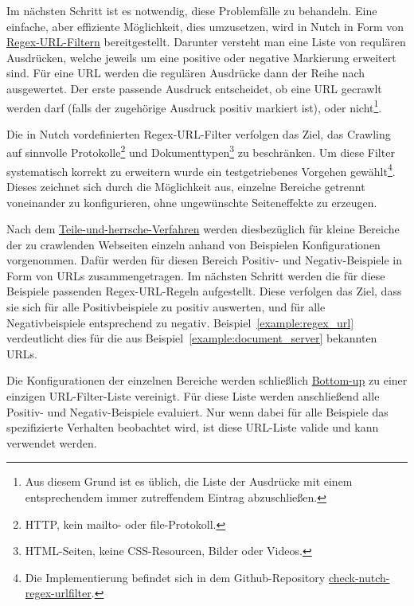 Im nächsten Schritt ist es notwendig, diese Problemfälle zu behandeln.
Eine einfache, aber effiziente Möglichkeit, dies umzusetzen, wird in Nutch in Form von \href{https://github.com/apache/nutch/blob/master/conf/regex-urlfilter.txt.template}{Regex-URL-Filtern} bereitgestellt.
Darunter versteht man eine Liste von requlären Ausdrücken, welche jeweils um eine positive oder negative Markierung erweitert sind.
Für eine URL werden die regulären Ausdrücke dann der Reihe nach ausgewertet.
Der erste passende Ausdruck entscheidet, ob eine URL gecrawlt werden darf (falls der zugehörige Ausdruck positiv markiert ist),
oder nicht\footnote{Aus diesem Grund ist es üblich, 
die Liste der Ausdrücke mit einem entsprechendem immer zutreffendem Eintrag abzuschließen.}.

Die in Nutch vordefinierten Regex-URL-Filter verfolgen das Ziel,
das Crawling auf sinnvolle Protokolle\footnote{HTTP, kein mailto- oder file-Protokoll.}
und Dokumenttypen\footnote{HTML-Seiten, keine CSS-Resourcen, Bilder oder Videos.} zu beschränken.
Um diese Filter systematisch korrekt zu erweitern wurde ein
testgetriebenes Vorgehen gewählt\footnote{Die Implementierung befindet
sich in dem Github-Repository \href{https://github.com/mam10eks/check-nutch-regex-urlfilter}{check-nutch-regex-urlfilter}.}.
Dieses zeichnet sich durch die Möglichkeit aus, einzelne Bereiche getrennt voneinander zu konfigurieren, ohne ungewünschte Seiteneffekte zu erzeugen.

Nach dem \href{https://de.wikipedia.org/wiki/Teile-und-herrsche-Verfahren}{Teile-und-herrsche-Verfahren} werden
diesbezüglich für kleine Bereiche der zu crawlenden Webseiten einzeln anhand von Beispielen Konfigurationen vorgenommen.
Dafür werden für diesen Bereich Positiv- und Negativ-Beispiele in Form von URLs zusammengetragen.
Im nächsten Schritt werden die für diese Beispiele passenden Regex-URL-Regeln aufgestellt.
Diese verfolgen das Ziel, dass sie sich für alle Positivbeispiele zu positiv auswerten, und für alle Negativbeispiele entsprechend zu negativ.
Beispiel~\ref{example:regex_url} verdeutlicht dies für die aus Beispiel~\ref{example:document_server} bekannten URLs.

Die Konfigurationen der einzelnen Bereiche werden schließlich \href{https://de.wikipedia.org/wiki/Top-down_und_Bottom-up}{Bottom-up} zu einer einzigen 
URL-Filter-Liste vereinigt.
Für diese Liste werden anschließend alle Positiv- und Negativ-Beispiele evaluiert.
Nur wenn dabei für alle Beispiele das spezifizierte Verhalten beobachtet wird, ist diese URL-Liste valide und kann verwendet werden.


